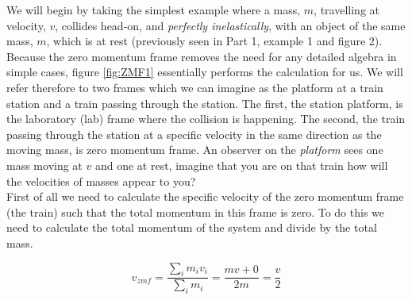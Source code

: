 \noindent We will begin by taking the simplest example where a mass, $m$, travelling at velocity, $v$, collides head-on, and {\it perfectly inelastically}, with an object of the same mass, $m$, which is at rest (previously seen in  Part 1, example 1 and figure 2).\\

\noindent Because the zero momentum frame removes the need for any detailed algebra in simple cases, figure \ref{fig:ZMF1} essentially performs the calculation for us.  We will refer therefore to two frames which we can imagine as the platform at a train station and a train passing through the station.
The first, the station platform, is the laboratory (lab) frame where the collision is happening.  The second, the train passing through the station at a specific velocity in the same direction as the moving mass, is zero momentum frame.  An observer on the {\it platform} sees one mass moving at $v$ and one at rest,  imagine that you are on that train how will the velocities of masses appear to you? \\

\noindent First of all we need to calculate the specific velocity of the zero momentum frame (the train) such that the total momentum in this frame is zero.  To do this we need to calculate the total momentum of the system and divide by the total mass.

\begin{equation}
v_{zmf}=\frac{\sum_i{m_i v_i}}{\sum_i m_i} = \frac{mv+0}{2m} = \frac{v}{2}
\end{equation}

